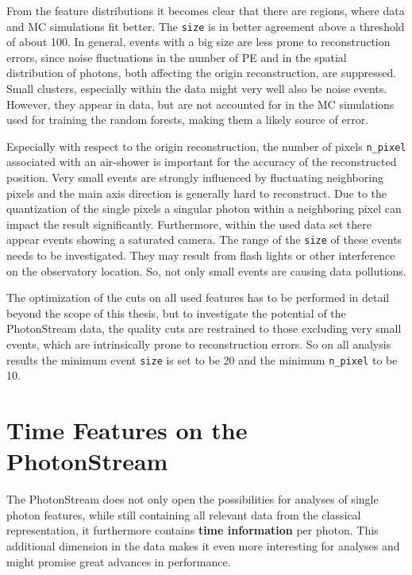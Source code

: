 %

From the feature distributions it becomes clear that there are regions, where
data and MC simulations fit better. The \texttt{size} is in better agreement
above a threshold of about \num{100}. In general, events with a big size are
less prone to reconstruction errors, since  noise fluctuations in the number of
PE and in the spatial distribution of photons, both affecting the origin
reconstruction, are suppressed. Small clusters, especially within the data
might very well also be noise events. However, they appear in data, but are not
accounted for in the MC simulations used for training the random forests, making them a likely source of error.

Especially with respect to the origin reconstruction, the number of pixels
\texttt{n\_pixel} associated with an air-shower is important for the accuracy
of the reconstructed position. Very small events are strongly influenced by
fluctuating neighboring pixels and the main axis direction is generally hard to
reconstruct. Due to the quantization of the single pixels a singular photon
within a neighboring pixel can impact the result significantly. Furthermore,
within the used data set there appear events showing a saturated camera. The
range of the \texttt{size} of these events needs to be investigated. They
may result from flash lights or other interference on the observatory location.
So, not only small events are causing data pollutions.

The optimization of the cuts on all used features has to be performed in
detail beyond the scope of this thesis, but to investigate the potential of the
PhotonStream data, the quality cuts are restrained to those excluding very
small events, which are intrinsically prone to reconstruction errors. So on all
analysis results the minimum event \texttt{size} is set to be \num{20} and the
minimum \texttt{n\_pixel} to be \num{10}.

\section{Time Features on the PhotonStream}
%
The PhotonStream does not only open the possibilities for analyses of single
photon features, while still containing all relevant data from the classical
representation, it furthermore contains \textbf{time information} per photon.
This additional dimension in the data makes it even more interesting for
analyses and might promise great advances in performance.

